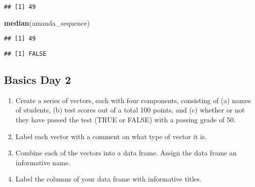\documentclass[]{article}
\newenvironment{Shaded}{\begin{snugshade}}{\end{snugshade}}
\newcommand{\CommentTok}[1]{\textcolor[rgb]{0.56,0.35,0.01}{\textit{#1}}}
\newcommand{\DecValTok}[1]{\textcolor[rgb]{0.00,0.00,0.81}{#1}}
\newcommand{\KeywordTok}[1]{\textcolor[rgb]{0.13,0.29,0.53}{\textbf{#1}}}
\newcommand{\NormalTok}[1]{#1}
\newcommand{\OperatorTok}[1]{\textcolor[rgb]{0.81,0.36,0.00}{\textbf{#1}}}
\newcommand{\StringTok}[1]{\textcolor[rgb]{0.31,0.60,0.02}{#1}}
\begin{document}
\begin{Shaded}
\end{Shaded}

\begin{verbatim}
## [1] 49
\end{verbatim}

\begin{Shaded}
\begin{Highlighting}[]
\KeywordTok{median}\NormalTok{(amanda_sequence) }
\end{Highlighting}
\end{Shaded}

\begin{verbatim}
## [1] 49
\end{verbatim}

\begin{Shaded}
\end{Shaded}

\begin{verbatim}
## [1] FALSE
\end{verbatim}

\hypertarget{basics-day-2}{%
\subsection{Basics Day 2}\label{basics-day-2}}

\begin{enumerate}
\def\labelenumi{\arabic{enumi}.}
\setcounter{enumi}{4}
\item
  Create a series of vectors, each with four components, consisting of
  (a) names of students, (b) test scores out of a total 100 points, and
  (c) whether or not they have passed the test (TRUE or FALSE) with a
  passing grade of 50.
\item
  Label each vector with a comment on what type of vector it is.
\item
  Combine each of the vectors into a data frame. Assign the data frame
  an informative name.
\item
  Label the columns of your data frame with informative titles.
\end{enumerate}
\end{document}

